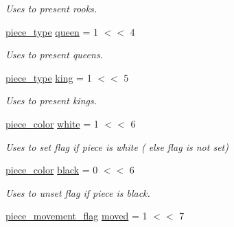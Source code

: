 \begin{DoxyCompactItemize}
\begin{DoxyCompactList}\small\item\em Uses to present rooks. \item\end{DoxyCompactList}\item 
\hypertarget{namespaceChEngn_a97924767720e8ba4e595ad9f161d73e8}{
\hyperlink{namespaceChEngn_a2a35c185f259757a78e937575b8ed483}{piece\_\-type} \hyperlink{namespaceChEngn_a97924767720e8ba4e595ad9f161d73e8}{queen} = 1 $<$$<$ 4}
\label{namespaceChEngn_a97924767720e8ba4e595ad9f161d73e8}

\begin{DoxyCompactList}\small\item\em Uses to present queens. \item\end{DoxyCompactList}\item 
\hypertarget{namespaceChEngn_a40c2dbaf0963b46704f08ffb28364cea}{
\hyperlink{namespaceChEngn_a2a35c185f259757a78e937575b8ed483}{piece\_\-type} \hyperlink{namespaceChEngn_a40c2dbaf0963b46704f08ffb28364cea}{king} = 1 $<$$<$ 5}
\label{namespaceChEngn_a40c2dbaf0963b46704f08ffb28364cea}

\begin{DoxyCompactList}\small\item\em Uses to present kings. \item\end{DoxyCompactList}\item 
\hypertarget{namespaceChEngn_aa3212b290980eb5db7f91e88f8803a9c}{
\hyperlink{namespaceChEngn_a9c81426c0134a97288a226c122daf62f}{piece\_\-color} \hyperlink{namespaceChEngn_aa3212b290980eb5db7f91e88f8803a9c}{white} = 1 $<$$<$ 6}
\label{namespaceChEngn_aa3212b290980eb5db7f91e88f8803a9c}

\begin{DoxyCompactList}\small\item\em Uses to set flag if piece is white ( else flag is not set) \item\end{DoxyCompactList}\item 
\hypertarget{namespaceChEngn_aa2bfc6fe87969d3e28eecbb682e802c8}{
\hyperlink{namespaceChEngn_a9c81426c0134a97288a226c122daf62f}{piece\_\-color} \hyperlink{namespaceChEngn_aa2bfc6fe87969d3e28eecbb682e802c8}{black} = 0 $<$$<$ 6}
\label{namespaceChEngn_aa2bfc6fe87969d3e28eecbb682e802c8}

\begin{DoxyCompactList}\small\item\em Uses to unset flag if piece is black. \item\end{DoxyCompactList}\item 
\hypertarget{namespaceChEngn_a2997c391593541b72a894e9cf44c90bf}{
\hyperlink{namespaceChEngn_a491b2eba2f766087f4f28948005ab16a}{piece\_\-movement\_\-flag} \hyperlink{namespaceChEngn_a2997c391593541b72a894e9cf44c90bf}{moved} = 1 $<$$<$ 7}
\label{namespaceChEngn_a2997c391593541b72a894e9cf44c90bf}


\end{DoxyCompactItemize}
